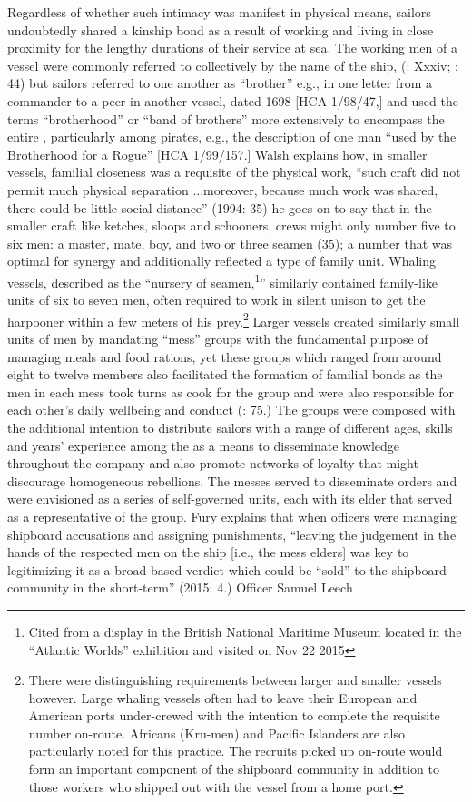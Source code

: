 Regardless of whether such intimacy was manifest in physical means, sailors undoubtedly shared a kinship bond as a result of working and living in close proximity for the lengthy durations of their service at sea. The working men of a vessel were commonly referred to collectively by the name of the ship, (\citealt{AdkinsAdkins2008}: Xxxiv; \citealt{Palmer1986}: 44) but sailors referred to one another as “brother” e.g., in one letter from a commander to a peer in another vessel, dated 1698 [HCA 1/98/47,] and used the terms “brotherhood” or “band of brothers” more extensively to encompass the entire , particularly among pirates, e.g., the description of one man “used by the Brotherhood for a Rogue” [HCA 1/99/157.] Walsh explains how, in smaller vessels, familial closeness was a requisite of the physical work, “such craft did not permit much physical separation ...moreover, because much work was shared, there could be little social distance” (1994: 35) he goes on to say that in the smaller craft like ketches, sloops and schooners, crews might only number five to six men: a master, mate, boy, and two or three seamen (35); a number that was optimal for synergy and additionally reflected a type of family unit. Whaling vessels, described as the “nursery of seamen,\footnote{Cited from a display in the British National Maritime Museum located in the “Atlantic Worlds” exhibition and visited on Nov 22 2015}” similarly contained family-like units of six to seven men, often required to work in silent unison to get the harpooner within a few meters of his prey.\footnote{There were distinguishing  requirements between larger and smaller vessels however. Large whaling vessels often had to leave their European and American ports under-crewed with the intention to complete the requisite  number on-route. Africans (Kru-men) and Pacific Islanders are also particularly noted for this practice. The recruits picked up on-route would form an important component of the shipboard community in addition to those workers who shipped out with the vessel from a home port.}  Larger vessels created similarly small units of men by mandating “mess” groups with the fundamental purpose of managing meals and food rations, yet these groups which ranged from around eight to twelve members also facilitated the formation of familial bonds as the men in each mess took turns as cook for the group and were also responsible for each other’s daily wellbeing and conduct (\citealt{AdkinsAdkins2008}: 75.) The groups were composed with the additional intention to distribute sailors with a range of different ages, skills and years’ experience among the  as a means to disseminate knowledge throughout the company and also promote networks of loyalty that might discourage homogeneous rebellions. The messes served to disseminate orders and were envisioned as a series of self-governed units, each with its elder that served as a representative of the group. Fury explains that when officers were managing shipboard accusations and assigning punishments, “leaving the judgement in the hands of the respected men on the ship [i.e., the mess elders] was key to legitimizing it as a broad-based verdict which could be “sold” to the shipboard community in the short-term” (2015: 4.) Officer Samuel Leech 